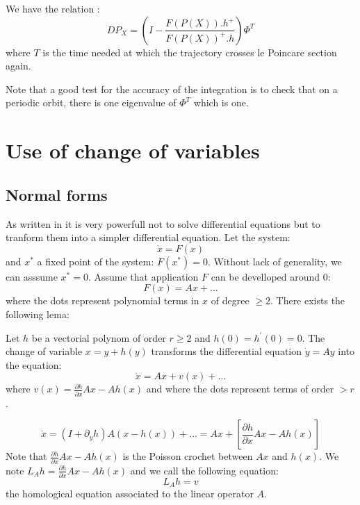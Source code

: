 \documentclass[12pt]{book}
\begin{document}
We have the relation :
\begin{equation}
DP_X=\left( I-\frac{F(P(X)).h^+}{F(P(X))^+.h}\right)\Phi^T
\end{equation}
where $T$ is the time needed at which the trajectory
crosses le Poincare section again.

\begin{rem}
Note that a good test for the accuracy of the integration 
is to check that on a periodic orbit, there is one eigenvalue of
$\Phi^T$ which is one.
\end{rem}

\section{Use of change of variables}
\subsection{Normal forms}
As written in \cite{ma:equad:Arnold83} it is very powerfull not to
solve differential equations but to tranform them into a simpler
differential equation.
\cite{ma:equad:Arnold83,ma:equad:Guckenheimer83,ma:equad:Berry78}
Let the system:
\begin{equation}
\dot x=F(x)
\end{equation}
and $x^*$ a fixed point of the system: $F(x^*)=0$. Without lack of
generality, we can asssume $x^*=0$.
Assume that application $F$ can be develloped around $0$:
\begin{equation}
F(x)=Ax+\dots
\end{equation}
where the dots represent polynomial terms in $x$ of degree $\geq 2$.
There exists the following lema:
\begin{thm}\label{lemplo}
Let $h$ be a vectorial polynom of order $r\geq 2$ and
$h(0)=h^\prime(0)=0$. The change of variable $x=y+h(y)$ transforms the
differential equation $\dot y=Ay$ into the equation:
\begin{equation}
\dot x=Ax+v(x)+\dots
\end{equation}
where $v(x)=\frac{\partial h}{\partial x}Ax-Ah(x)$ and where the dots
represent terms of order $>r$.
\end{thm}
\begin{equation}
\dot x=(I+\partial_y h)A(x-h(x))+\dots= Ax+[\frac{\partial h}{\partial
x}Ax-Ah(x)] 
\end{equation}
Note that $\frac{\partial h}{\partial x}Ax-Ah(x)$ is the Poisson
crochet between $Ax$ and $h(x)$.
We note $L_Ah=\frac{\partial h}{\partial x}Ax-Ah(x)$ and we call the
following equation:
\begin{equation}
L_Ah=v
\end{equation}
the homological equation associated to the linear operator $A$.
\end{document}
